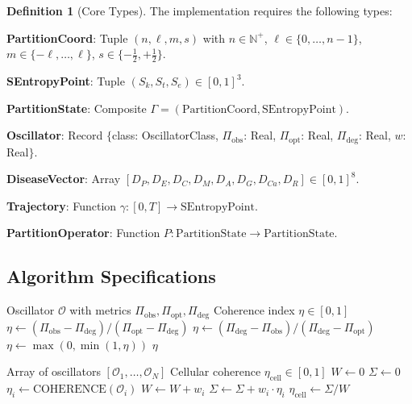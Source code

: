 \documentclass[10pt,twocolumn]{article}
\theoremstyle{plain}
\theoremstyle{definition}
\newtheorem{definition}[theorem]{Definition}
\theoremstyle{remark}
\newcommand{\N}{\mathbb{N}}
\newcommand{\Sk}{S_k}
\newcommand{\St}{S_t}
\newcommand{\Se}{S_e}
\newcommand{\Gstate}{\Gamma}
\newcommand{\Pop}{P}
\newcommand{\etacell}{\eta_{\mathrm{cell}}}
\begin{document}
\begin{definition}[Core Types]
\label{def:types}
The implementation requires the following types:

\textbf{PartitionCoord}: Tuple $(n, \ell, m, s)$ with $n \in \N^+$, $\ell \in \{0,\ldots,n-1\}$, $m \in \{-\ell,\ldots,\ell\}$, $s \in \{-\frac{1}{2}, +\frac{1}{2}\}$.

\textbf{SEntropyPoint}: Tuple $(\Sk, \St, \Se) \in [0,1]^3$.

\textbf{PartitionState}: Composite $\Gstate = (\text{PartitionCoord}, \text{SEntropyPoint})$.

\textbf{Oscillator}: Record $\{$class: OscillatorClass, $\Pi_{\mathrm{obs}}$: Real, $\Pi_{\mathrm{opt}}$: Real, $\Pi_{\mathrm{deg}}$: Real, $w$: Real$\}$.

\textbf{DiseaseVector}: Array $[D_P, D_E, D_C, D_M, D_A, D_G, D_{Ca}, D_R] \in [0,1]^8$.

\textbf{Trajectory}: Function $\gamma: [0,T] \to \text{SEntropyPoint}$.

\textbf{PartitionOperator}: Function $\Pop: \text{PartitionState} \to \text{PartitionState}$.
\end{definition}

\subsection{Algorithm Specifications}

\begin{algorithm}[h]
\caption{COHERENCE: Compute oscillator coherence index}
\label{alg:coherence}
\begin{algorithmic}[1]
\REQUIRE Oscillator $\mathcal{O}$ with metrics $\Pi_{\mathrm{obs}}, \Pi_{\mathrm{opt}}, \Pi_{\mathrm{deg}}$
\ENSURE Coherence index $\eta \in [0,1]$
    \STATE $\eta \leftarrow (\Pi_{\mathrm{obs}} - \Pi_{\mathrm{deg}}) / (\Pi_{\mathrm{opt}} - \Pi_{\mathrm{deg}})$
\ELSE
    \STATE $\eta \leftarrow (\Pi_{\mathrm{deg}} - \Pi_{\mathrm{obs}}) / (\Pi_{\mathrm{deg}} - \Pi_{\mathrm{opt}})$
\ENDIF
\STATE $\eta \leftarrow \max(0, \min(1, \eta))$ 
\RETURN $\eta$
\end{algorithmic}
\end{algorithm}

\begin{algorithm}[h]
\caption{CELLULAR\_COHERENCE: Compute cellular coherence}
\label{alg:cellular}
\begin{algorithmic}[1]
\REQUIRE Array of oscillators $[\mathcal{O}_1, \ldots, \mathcal{O}_N]$
\ENSURE Cellular coherence $\etacell \in [0,1]$
\STATE $W \leftarrow 0$
\STATE $\Sigma \leftarrow 0$
    \STATE $\eta_i \leftarrow \text{COHERENCE}(\mathcal{O}_i)$
    \STATE $W \leftarrow W + w_i$
    \STATE $\Sigma \leftarrow \Sigma + w_i \cdot \eta_i$
\ENDFOR
\RETURN $\etacell \leftarrow \Sigma / W$
\end{algorithmic}
\end{algorithm}
\end{document}
